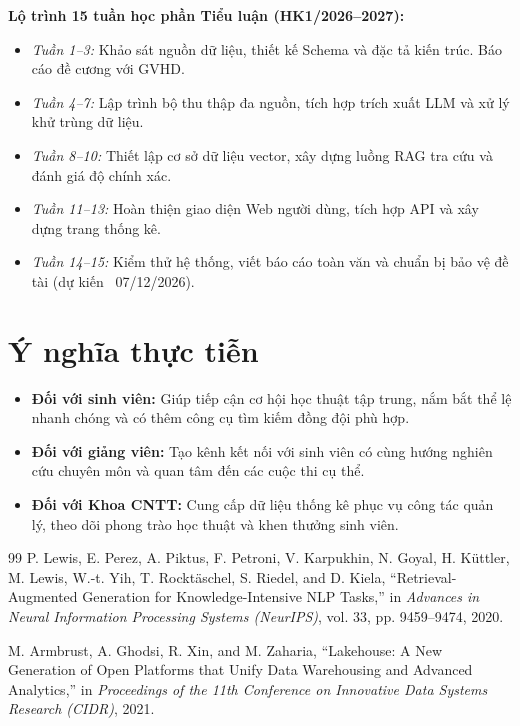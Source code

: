 \documentclass[11pt,a4paper]{article}
\begin{document}
\begin{enumerate}
\noindent\textbf{Lộ trình 15 tuần học phần Tiểu luận (HK1/2026--2027):}
\begin{itemize}
    \item \textit{Tuần 1--3:} Khảo sát nguồn dữ liệu, thiết kế Schema và đặc tả kiến trúc. Báo cáo đề cương với GVHD.
    \item \textit{Tuần 4--7:} Lập trình bộ thu thập đa nguồn, tích hợp trích xuất LLM và xử lý khử trùng dữ liệu.
    \item \textit{Tuần 8--10:} Thiết lập cơ sở dữ liệu vector, xây dựng luồng RAG tra cứu và đánh giá độ chính xác.
    \item \textit{Tuần 11--13:} Hoàn thiện giao diện Web người dùng, tích hợp API và xây dựng trang thống kê.
    \item \textit{Tuần 14--15:} Kiểm thử hệ thống, viết báo cáo toàn văn và chuẩn bị bảo vệ đề tài (dự kiến ~07/12/2026).
\end{itemize}

\section{Ý nghĩa thực tiễn}
\begin{itemize}
    \item \textbf{Đối với sinh viên:} Giúp tiếp cận cơ hội học thuật tập trung, nắm bắt thể lệ nhanh chóng và có thêm công cụ tìm kiếm đồng đội phù hợp.
    \item \textbf{Đối với giảng viên:} Tạo kênh kết nối với sinh viên có cùng hướng nghiên cứu chuyên môn và quan tâm đến các cuộc thi cụ thể.
    \item \textbf{Đối với Khoa CNTT:} Cung cấp dữ liệu thống kê phục vụ công tác quản lý, theo dõi phong trào học thuật và khen thưởng sinh viên.
\end{itemize}

\begin{thebibliography}{99}
\small
{} 
P. Lewis, E. Perez, A. Piktus, F. Petroni, V. Karpukhin, N. Goyal, H. K{\"u}ttler, M. Lewis, W.-t. Yih, T. Rockt{\"a}schel, S. Riedel, and D. Kiela, ``Retrieval-Augmented Generation for Knowledge-Intensive NLP Tasks,'' in \textit{Advances in Neural Information Processing Systems (NeurIPS)}, vol. 33, pp. 9459--9474, 2020.

M. Armbrust, A. Ghodsi, R. Xin, and M. Zaharia, ``Lakehouse: A New Generation of Open Platforms that Unify Data Warehousing and Advanced Analytics,'' in \textit{Proceedings of the 11th Conference on Innovative Data Systems Research (CIDR)}, 2021.


\end{thebibliography}
\end{enumerate}
\end{document}
